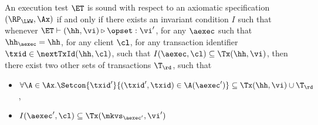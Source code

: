 
\begin{definition}
\label{def:et_sound}
An execution test $\ET$ is sound with respect to an axiomatic 
specification $(\RP_{\LWW}, \Ax)$ if and only if there exists an 
invariant condition $I$ such that whenever $\ET \vdash (\hh, \vi) 
\triangleright \opset: \vi'$, for any $\aexec$ such that 
$\hh_{\aexec} = \hh$, for any client $\cl$, for any 
transaction identifier $\txid \in \nextTxId(\hh, \cl)$, 
such that  $I(\aexec, \cl) \subseteq \Tx(\hh, \vi)$, then  
there exist two other sets of transactions $\T_{\rd}$, 
such that 
\begin{itemize}
\item $\forall \A \in \Ax. \Setcon{\txid' }{ (\txid', \txid) \in \A(\aexec')} \subseteq \Tx(\hh, \vi) \cup \T_{\rd}$, 
\item $I(\aexec', \cl) \subseteq \Tx(\mkvs_{\aexec'}, \vi')$
\end{itemize}
\end{definition}

